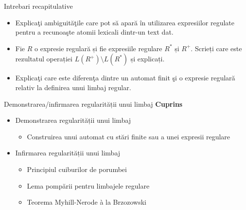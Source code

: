 \documentclass[pdf]{beamer}
\begin{document}
\begin{frame}{Intrebari recapitulative}
\begin{itemize}

\item
Explicaţi ambiguităţile care pot să apară în utilizarea expresiilor regulate pentru a recunoaşte atomii lexicali dintr-un text dat.
\newline

\item
Fie $R$ o expresie regulară și fie expresiile regulare $R^*$ și $R^+$. Scrieți care este rezultatul operației $L(R^+)\setminus L(R^*)$ și explicați.
\newline

\item
Explicaţi care este diferenţa dintre un automat finit şi o expresie regulară relativ la definirea unui limbaj regular.
\newline

\end{itemize}
\end{frame}






\begin{frame}{Demonstrarea/infirmarea regularității unui limbaj}
\textbf{Cuprins}
\begin{itemize}
\item
Demonstrarea regularității unui limbaj
\begin{itemize}
\item
Construirea unui automat cu stări finite sau a unei expresii regulare
\end{itemize}
\item
Infirmarea regularității unui limbaj
\begin{itemize}
\item
Principiul cuiburilor de porumbei
\item
Lema pompării pentru limbajele regulare
\item
Teorema Myhill-Nerode à la Brzozowski
\end{itemize}
\end{itemize}
\end{frame}
\end{document}
